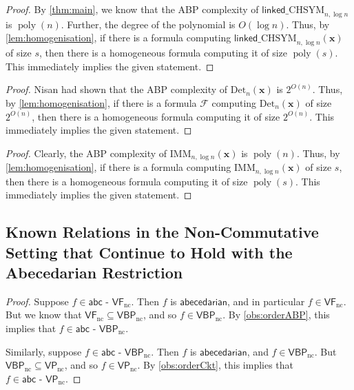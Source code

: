 \documentclass[10pt,a4paper]{article}
\def\poly{\operatorname{poly}}
\def\vecx{\mathbf{x}}
\def\ncVF{\mathsf{VF}_{\text{nc}}}
\def\ncVBP{\mathsf{VBP}_{\text{nc}}}
\def\ncVP{\mathsf{VP}_{\text{nc}}}
\newcommand{\form}{\textbf{$\mathcal{F}$}}
\newcommand{\abcd}{\mathsf{abecedarian}}
\def\abcncVF{\mathsf{abc \text{ - } VF}_{\text{nc}}}
\def\abcncVBP{\mathsf{abc \text{ - } VBP}_{\text{nc}}}
\def\abcncVP{\mathsf{abc \text{ - } VP}_{\text{nc}}}
\newcommand{\Det}[1]{\mathrm{Det}_{#1}}
\newcommand{\imm}[2]{\mathrm{IMM}_{#1,#2}}
\newcommand{\lchsym}[2]{\mathrm{\mathsf{linked}\_CHSYM}_{#1,#2}}
\begin{document}
\FormLBfromHomFormLB*

\begin{proof}
	By \autoref{thm:main}, we know that the ABP complexity of $\lchsym{n}{\log n}$ is $\poly(n)$.
	Further, the degree of the polynomial is $O(\log n)$.
	Thus, by \autoref{lem:homogenisation}, if there is a formula computing $\lchsym{n}{\log n}(\vecx)$ of size $s$, then there is a homogeneous formula computing it of size $\poly(s)$.
	This immediately implies the given statement.
\end{proof}

\FormLBfromHomDetLB*

\begin{proof}
	Nisan \cite{N91} had shown that the ABP complexity of $\Det{n}(\vecx)$ is $2^{O(n)}$. 
	Thus, by \autoref{lem:homogenisation}, if there is a formula $\form$ computing $\Det{n}(\vecx)$ of size $2^{O(n)}$, then there is a homogeneous formula computing it of size $2^{O(n)}$.
	This immediately implies the given statement.
\end{proof}

\FormLBfromHomImmLB*

\begin{proof}
	Clearly, the ABP complexity of $\imm{n}{\log n}(\vecx)$ is $\poly(n)$.
	Thus, by \autoref{lem:homogenisation}, if there is a formula computing $\imm{n}{\log n}(\vecx)$ of size $s$, then there is a homogeneous formula computing it of size $\poly(s)$.
	This immediately implies the given statement.
\end{proof}

\subsection{Known Relations in the Non-Commutative Setting that Continue to Hold with the Abecedarian Restriction}

\usualInclusions*

\begin{proof}
	Suppose $f \in \abcncVF$. 
	Then $f$ is $\abcd$, and in particular $f \in \ncVF$.
	But we know that $\ncVF \subseteq \ncVBP$, and so $f \in \ncVBP$.
	By \autoref{obs:orderABP}, this implies that $f \in \abcncVBP$.

	Similarly, suppose $f \in \abcncVBP$. 
	Then $f$ is $\abcd$, and $f \in \ncVBP$.
	But $\ncVBP \subseteq \ncVP$, and so $f \in \ncVP$.
	By \autoref{obs:orderCkt}, this implies that $f \in \abcncVP$.
\end{proof}
\end{document}
